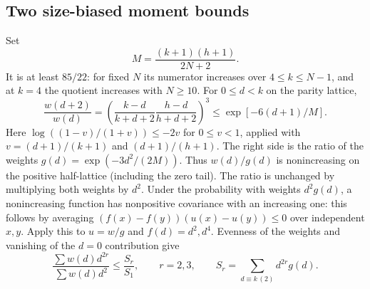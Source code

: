 \documentclass[11pt,a4paper]{article}
\begin{document}
\subsection{Two size-biased moment bounds}
Set
\[
 M=\frac{(k+1)(h+1)}{2N+2}.
\]
It is at least $85/22$: for fixed $N$ its numerator increases over
$4\le k\le N-1$, and at $k=4$ the quotient increases with $N\ge10$.
For $0\le d<k$ on the parity lattice,
\[
 \frac{w(d+2)}{w(d)}
 =\left(\frac{k-d}{k+d+2}\frac{h-d}{h+d+2}\right)^3
 \le \exp[-6(d+1)/M].
\]
Here $\log((1-v)/(1+v))\le-2v$ for $0\le v<1$,
applied with $v=(d+1)/(k+1)$ and $(d+1)/(h+1)$.
The right side is the ratio of the weights
$g(d)=\exp(-3d^2/(2M))$. Thus $w(d)/g(d)$ is
nonincreasing on the positive half-lattice (including the zero tail).
The ratio is unchanged by multiplying both weights by $d^2$.
Under the probability with weights $d^2g(d)$, a nonincreasing function
has nonpositive covariance with an increasing one: this follows by
averaging $(f(x)-f(y))(u(x)-u(y))\le0$ over independent $x,y$.
Apply this to $u=w/g$ and $f(d)=d^2,d^4$.
Evenness of the weights and vanishing of the $d=0$ contribution give
\begin{equation}\label{R19M:eq:dom}
 \frac{\sum w(d)d^{2r}}{\sum w(d)d^2}
 \le \frac{S_r}{S_1},\qquad r=2,3,\qquad
 S_r=\sum_{d\equiv k\, (2)} d^{2r}g(d).
\end{equation}
\end{document}
